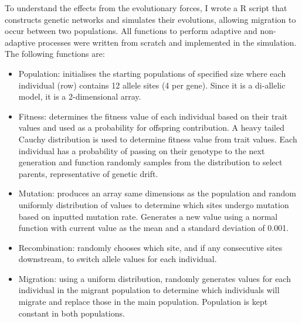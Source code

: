 To understand the effects from the evolutionary forces, I wrote a R script that constructs genetic networks and simulates their evolutions, allowing migration to occur between two populations. All functions to perform adaptive and non-adaptive processes were written from scratch and implemented in the simulation. The following functions are:
\begin{itemize}
    \item Population: initialises the starting populations of specified size where each individual (row) contains 12 allele sites (4 per gene). Since it is a di-allelic model, it is a 2-dimensional array.
    \item Fitness: determines the fitness value of each individual based on their trait values and used as a probability for offspring contribution. A heavy tailed Cauchy distribution is used to determine fitness value from trait values. Each individual has a probability of passing on their genotype to the next generation and function randomly samples from the distribution to select parents, representative of genetic drift.
    \item Mutation: produces an array same dimensions as the population and random uniformly distribution of values to determine which sites undergo mutation based on inputted mutation rate. Generates a new value using a normal function with current value as the mean and a standard deviation of 0.001.
    \item Recombination: randomly chooses which site, and if any consecutive sites downstream, to switch allele values for each individual.
    \item Migration: using a uniform distribution, randomly generates values for each individual in the migrant population to determine which individuals will migrate and replace those in the main population. Population is kept constant in both populations.
\end{itemize}

